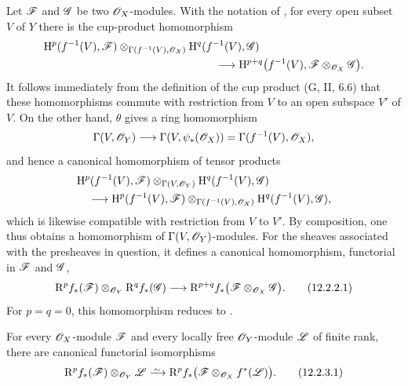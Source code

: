 \begin{env}[12.2.2]
\label{0.12.2.2}
Let $\mathscr{F}$ and $\mathscr{G}$ be two $\mathscr{O}_X$-modules.
With the notation of , for every open subset $V$ of
$Y$ there is the cup-product homomorphism 
\[
  \begin{aligned}
  &\HH^p(f^{-1}(V),\sh{F})
    \otimes_{\Gamma(f^{-1}(V),\sh{O}_X)}
    \HH^q(f^{-1}(V),\sh{G})\\
  &\hspace{55mm}\longrightarrow
    \HH^{p+q}\bigl(f^{-1}(V),
      \sh{F}\otimes_{\sh{O}_X}\sh{G}\bigr).
  \end{aligned}
\]
It follows immediately from the definition of the cup product
(G, II, 6.6) that these homomorphisms commute with restriction from
$V$ to an open subspace $V'$ of $V$.
On the other hand, $\theta$ gives a ring homomorphism
\[
  \Gamma(V,\mathscr{O}_Y)
  \longrightarrow\Gamma(V,\psi_*(\mathscr{O}_X))
  =\Gamma(f^{-1}(V),\mathscr{O}_X),
\]
and hence a canonical homomorphism of tensor products
\[
  \begin{aligned}
  &\mathrm{H}^p(f^{-1}(V),\mathscr{F})
    \otimes_{\Gamma(V,\mathscr{O}_Y)}
    \mathrm{H}^q(f^{-1}(V),\mathscr{G})\\
  &\quad\longrightarrow
    \mathrm{H}^p(f^{-1}(V),\mathscr{F})
    \otimes_{\Gamma(f^{-1}(V),\mathscr{O}_X)}
    \mathrm{H}^q(f^{-1}(V),\mathscr{G}),
  \end{aligned}
\]
which is likewise compatible with restriction from $V$ to $V'$.
By composition, one thus obtains a homomorphism of
$\Gamma(V,\mathscr{O}_Y)$-modules.  For the sheaves associated with the
presheaves in question, it defines a canonical homomorphism,
functorial in $\mathscr{F}$ and $\mathscr{G}$,
\[
  \mathrm{R}^p f_*(\mathscr{F})\otimes_{\mathscr{O}_Y}\mathrm{R}^q f_*(\mathscr{G})
  \longrightarrow
  \mathrm{R}^{p+q}f_*
    \bigl(\mathscr{F}\otimes_{\mathscr{O}_X}\mathscr{G}\bigr).
  \tag{12.2.2.1}
  \label{0.12.2.2.1}
\]
For $p=q=0$, this homomorphism reduces to
.
\end{env}

\begin{proposition}[12.2.3]
\label{0.12.2.3}
For every $\mathscr{O}_X$-module $\mathscr{F}$ and every locally free
$\mathscr{O}_Y$-module $\mathscr{L}$ of finite rank, there are canonical
functorial isomorphisms
\[
  \RR^p f_*(\sh{F})\otimes_{\sh{O}_Y}\sh{L}
  \simto
  \RR^p f_*
    \bigl(\sh{F}\otimes_{\sh{O}_X}f^*(\sh{L})\bigr).
  \tag{12.2.3.1}
  \label{0.12.2.3.1}
\]
\end{proposition}

